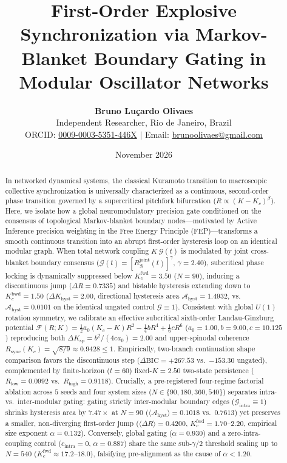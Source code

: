 \documentclass[11pt,a4paper]{article}
\title{\textbf{First-Order Explosive Synchronization via Markov-Blanket Boundary Gating in Modular Oscillator Networks}}
\author{
    \textbf{Bruno Lu\c{c}ardo Olivaes}\\
    \small Independent Researcher, Rio de Janeiro, Brazil\\
    \small ORCID: \href{https://orcid.org/0009-0003-5351-446X}{0009-0003-5351-446X} \quad $\vert$ \quad Email: \href{mailto:brunoolivaes@gmail.com}{brunoolivaes@gmail.com}
}
\date{November 2026}
\begin{document}
\maketitle

\begin{abstract}
In networked dynamical systems, the classical Kuramoto transition to macroscopic collective synchronization is universally characterized as a continuous, second-order phase transition governed by a supercritical pitchfork bifurcation ($R \propto (K - K_c)^\beta$). Here, we isolate how a global neuromodulatory precision gate conditioned on the consensus of topological Markov-blanket boundary nodes---motivated by Active Inference precision weighting in the Free Energy Principle (FEP)---transforms a smooth continuous transition into an abrupt first-order hysteresis loop on an identical modular graph. When total network coupling $K\,\mathcal{G}(t)$ is modulated by joint cross-blanket boundary consensus ($\mathcal{G}(t) = [R_{\mathcal{B}}^{\mathrm{joint}}(t)]^\gamma$, $\gamma = 2.40$), subcritical phase locking is dynamically suppressed below $K_c^{\mathrm{fwd}} = 3.50$ ($N=90$), inducing a discontinuous jump ($\Delta R = 0.7335$) and bistable hysteresis extending down to $K_c^{\mathrm{bwd}} = 1.50$ ($\Delta K_{\mathrm{hyst}} = 2.00$, directional hysteresis area $\mathcal{A}_{\mathrm{hyst}} = 1.4932$, vs.\ $\mathcal{A}_{\mathrm{hyst}} = 0.0101$ on the identical ungated control $\mathcal{G} \equiv 1$). Consistent with global $U(1)$ rotation symmetry, we calibrate an effective subcritical sixth-order Landau-Ginzburg potential $\mathcal{F}(R; K) = \frac{1}{2} a_0 (K_c - K) R^2 - \frac{1}{4} b R^4 + \frac{1}{6} c R^6$ ($a_0 = 1.00, b = 9.00, c = 10.125$) reproducing both $\Delta K_{\mathrm{sp}} = b^2/(4ca_0) = 2.00$ and upper-spinodal coherence $R_{\mathrm{sync}}(K_c) = \sqrt{8/9} \approx 0.9428 \le 1$. Empirically, two-branch continuation shape comparison favors the discontinuous step ($\Delta\mathrm{BIC} = +267.53$ vs.\ $-153.30$ ungated), complemented by finite-horizon ($t=60$) fixed-$K=2.50$ two-state persistence ($R_{\mathrm{low}} = 0.0992$ vs.\ $R_{\mathrm{high}} = 0.9118$). Crucially, a pre-registered four-regime factorial ablation across $5$ seeds and four system sizes ($N \in \{90, 180, 360, 540\}$) separates intra- vs.\ inter-modular gating: gating strictly inter-modular boundary edges ($\mathcal{G}_{\mathrm{intra}} \equiv 1$) shrinks hysteresis area by $7.47\times$ at $N=90$ ($\langle\mathcal{A}_{\mathrm{hyst}}\rangle = 0.1018$ vs.\ $0.7613$) yet preserves a smaller, non-diverging first-order jump ($\langle\Delta R\rangle = 0.4200$, $K_c^{\mathrm{fwd}} = 1.70\text{--}2.20$, empirical size exponent $\alpha = 0.132$). Conversely, global gating ($\alpha = 0.930$) and a zero-intra-coupling control ($c_{\mathrm{intra}} = 0$, $\alpha = 0.887$) share the same sub-$\gamma/2$ threshold scaling up to $N=540$ ($K_c^{\mathrm{fwd}} \approx 17.2\text{--}18.0$), falsifying pre-alignment as the cause of $\alpha < 1.20$.
\end{abstract}
\end{document}
